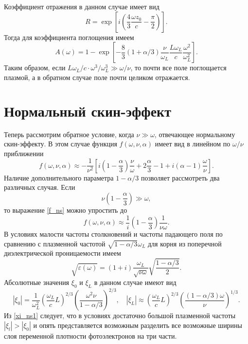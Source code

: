 \documentclass[12pt,a4paper]{article}
\numberwithin{equation}{section}
\begin{document}
{Коэффициент отражения в данном случае имеет вид 
\begin{equation}
    \label{coeff1_big}
    R = \exp\left[i\left(\frac{4}{3} \frac{\omega z_0}{c}-\frac{\pi}{2}\right)\right].
\end{equation}
Тогда для коэффициента поглощения имеем 
\begin{equation}
   \label{coeff2_big}
   A\left(\omega\right) = 1-\exp\left[-\frac{8}{3}\left(1+\alpha/3\right)\frac{\nu}{\omega_L}\frac{L\omega_L}{c}\frac{\omega^2}{\omega_L^2}\right].
\end{equation}
Таким образом, если $L\omega_L/c\cdot\omega^3/\omega_L^3\gg\omega/\nu$, то почти все поле поглощается плазмой, а в обратном случае поле почти целиком отражается.
\section{Нормальный скин-эффект}
Теперь рассмотрим обратное условие, когда $\nu \gg \omega$, отвечающее нормальному скин-эффекту. В этом случае функция $f\left(\omega, \nu, \alpha\right)$ имеет вид в линейном по $\omega/\nu$ приближении
\begin{equation}
    \label{f_ns}
    f\left(\omega, \nu, \alpha\right) \approx -\frac{1}{\nu^2}\left[i\left(1-\frac{\alpha}{3}\right)\frac{\nu}{\omega}+2\frac{\alpha}{3}-1+i\left(\alpha-1\right)\frac{\omega}{\nu}\right].
\end{equation}
Наличие дополнительного параметра $1-\alpha/3$ позволяет рассмотреть два различных случая. Если 
\begin{equation}
    \label{cond1}
    \nu\left(1-\frac{\alpha}{3}\right) \gg \omega,
\end{equation}
то выражение \eqref{f_ns} можно упростить до 
\begin{equation}
    \label{f_cond1}
    f\left(\omega, \nu, \alpha\right) \approx \frac{1}{i} \left(1-\frac{\alpha}{3}\right)\frac{1}{\nu\omega}.
\end{equation}
В условиях малости частоты столкновений и частоты падающего поля по сравнению с плазменной частотой $\sqrt{1-\alpha/3}\omega_L$ для корня из поперечной диэлектрической проницаемости имеем
\begin{equation}
    \label{perm_ns1}
    \sqrt{\varepsilon\left(\omega\right)} = \left(1+i\right)\frac{\omega_L}{\sqrt{\nu \omega}}\sqrt{\frac{1-\alpha/3}{2}}.
\end{equation}
Абсолютные значения $\xi_0$ и $\xi_L$ в данном случае имеют вид
\begin{equation}
\label{xi_ns1}
    |\xi_0|= \frac{1}{\omega_L^2}\left(\frac{\omega_L}{c}L\right)^{2/3}\left(\frac{\omega^2\nu}{1-\alpha/3}\right)^{2/3},\quad |\xi_L|\approx \left(\frac{\omega_L}{c}L\right)^{2/3}\left(\frac{\left(1-\alpha/3\right)\omega}{\nu}\right)^{1/3}.
\end{equation}
Из \eqref{xi_ns1} следует, что в условиях достаточно большой плазменной частоты $|\xi_l|>|\xi_0|$ и опять представляется возможным разделить все возможные ширины слоя переменной плотности фотоэлектронов на три части.
}
\end{document}

